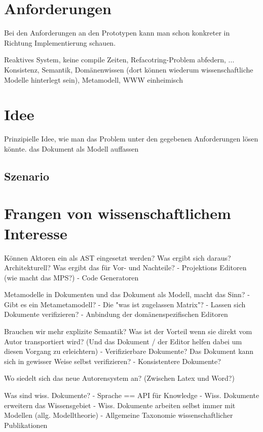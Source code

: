 \section{Anforderungen}

Bei den Anforderungen an den Prototypen kann man schon
konkreter in Richtung Implementierung schauen.


Reaktives System, keine compile Zeiten, Refacotring-Problem abfedern, ...
Konsistenz, Semantik, Domänenwissen (dort können wiederum wissenschaftliche Modelle hinterlegt sein), Metamodell, WWW einheimisch

\section{Idee}

Prinzipielle Idee, wie man das Problem unter den gegebenen Anforderungen lösen könnte.
das Dokument als Modell auffassen

\subsection{Szenario}

\section{Frangen von wissenschaftlichem Interesse}

Können Aktoren ein als AST eingesetzt werden?
Was ergibt sich daraus? Architekturell? Was ergibt das für Vor- und Nachteile?
  - Projektions Editoren (wie macht das MPS?)
  - Code Generatoren

Metamodelle in Dokumenten und das Dokument als Modell, macht das Sinn?
  - Gibt es ein Metametamodell?
  - Die "was ist zugelassen Matrix"?
  - Lassen sich Dokumente verifizieren?
  - Anbindung der domänenspezifischen Editoren

Brauchen wir mehr explizite Semantik? Was ist der Vorteil wenn sie direkt
vom Autor transportiert wird? (Und das Dokument / der Editor helfen dabei
um diesen Vorgang zu erleichtern)
  - Verifizierbare Dokumente? Das Dokument kann sich in gewisser Weise selbst verifizieren?
  - Konsistentere Dokumente?

Wo siedelt sich das neue Autorensystem an? (Zwischen Latex und Word?)

Was sind wiss. Dokumente?
  - Sprache == API für Knowledge
  - Wiss. Dokumente erweitern das Wissensgebiet
  - Wiss. Dokumente arbeiten selbst immer mit Modellen (allg. Modelltheorie)
  - Allgemeine Taxonomie wissenschaftlicher Publikationen

